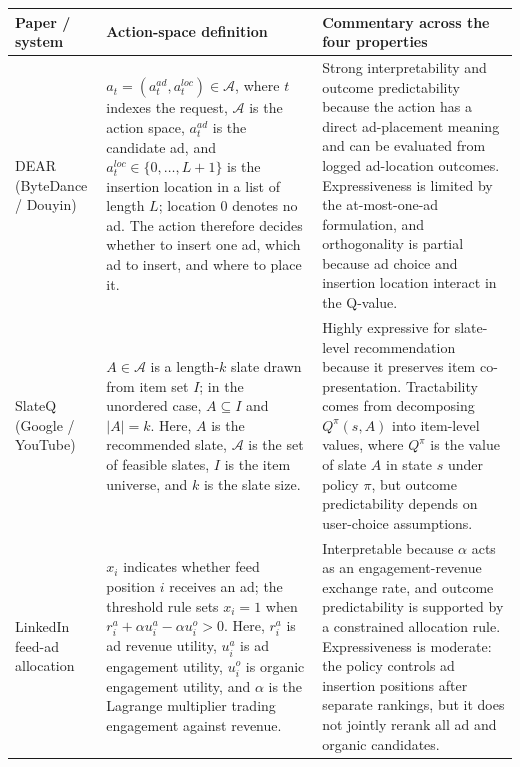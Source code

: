 \documentclass[manuscript,review,screen]{acmart}
\begin{document}
\begin{table}[ht]
\centering
\footnotesize
\renewcommand{\arraystretch}{1.15}
\setlength{\tabcolsep}{4pt}
\begin{tabularx}{\textwidth}{>{\raggedright\arraybackslash}p{} >{\raggedright\arraybackslash}X >{\raggedright\arraybackslash}X}
\toprule
\textbf{Paper / system} & \textbf{Action-space definition} & \textbf{Commentary across the four properties} \\
\midrule
DEAR (ByteDance / Douyin) \cite{zhao2021dear} & $a_t=(a_t^{ad},a_t^{loc})\in\mathcal{A}$, where $t$ indexes the request, $\mathcal{A}$ is the action space, $a_t^{ad}$ is the candidate ad, and $a_t^{loc}\in\{0,\ldots,L+1\}$ is the insertion location in a list of length $L$; location $0$ denotes no ad. The action therefore decides whether to insert one ad, which ad to insert, and where to place it. & Strong interpretability and outcome predictability because the action has a direct ad-placement meaning and can be evaluated from logged ad-location outcomes. Expressiveness is limited by the at-most-one-ad formulation, and orthogonality is partial because ad choice and insertion location interact in the Q-value. \\
SlateQ (Google / YouTube) \cite{ie2019slateq} & $A\in\mathcal{A}$ is a length-$k$ slate drawn from item set $I$; in the unordered case, $A\subseteq I$ and $|A|=k$. Here, $A$ is the recommended slate, $\mathcal{A}$ is the set of feasible slates, $I$ is the item universe, and $k$ is the slate size. & Highly expressive for slate-level recommendation because it preserves item co-presentation. Tractability comes from decomposing $Q^\pi(s,A)$ into item-level values, where $Q^\pi$ is the value of slate $A$ in state $s$ under policy $\pi$, but outcome predictability depends on user-choice assumptions. \\
LinkedIn feed-ad allocation \cite{yan2020ads} & $x_i$ indicates whether feed position $i$ receives an ad; the threshold rule sets $x_i=1$ when $r_i^a+\alpha u_i^a-\alpha u_i^o>0$. Here, $r_i^a$ is ad revenue utility, $u_i^a$ is ad engagement utility, $u_i^o$ is organic engagement utility, and $\alpha$ is the Lagrange multiplier trading engagement against revenue. & Interpretable because $\alpha$ acts as an engagement-revenue exchange rate, and outcome predictability is supported by a constrained allocation rule. Expressiveness is moderate: the policy controls ad insertion positions after separate rankings, but it does not jointly rerank all ad and organic candidates. \\

\end{tabularx}
\end{table}
\end{document}
